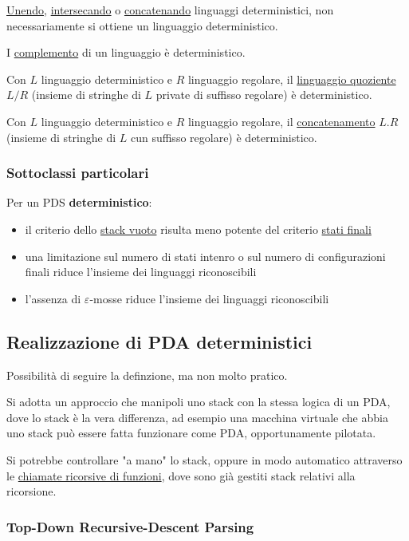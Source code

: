 \underline{Unendo}, \underline{intersecando} o \underline{concatenando} linguaggi deterministici,  non necessariamente si ottiene un linguaggio deterministico.

I \underline{complemento} di un linguaggio è deterministico.

Con $L$ linguaggio deterministico e $R$ linguaggio regolare, il \underline{linguaggio quoziente}  $L/R$ (insieme di stringhe di $L$ private di suffisso regolare) è deterministico.

Con $L$ linguaggio deterministico e $R$ linguaggio regolare, il \underline{concatenamento} $L.R$ (insieme di stringhe di $L$ cun suffisso regolare) è deterministico.

\subsubsection{Sottoclassi particolari}
Per un PDS \textbf{deterministico}:
\begin{itemize}
    \item il criterio dello \underline{stack vuoto} risulta meno potente del criterio \underline{stati finali}
    \item una limitazione sul numero di stati intenro o sul numero di configurazioni finali riduce l'insieme dei linguaggi riconoscibili
    \item l'assenza di $\varepsilon$-mosse riduce l'insieme dei linguaggi riconoscibili
\end{itemize}


\subsection{Realizzazione di PDA deterministici}
Possibilità di seguire la definzione, ma non molto pratico.

Si adotta un approccio che manipoli uno stack con la stessa logica di un PDA, dove lo stack è la vera differenza, ad esempio una macchina virtuale che abbia uno stack può essere fatta funzionare come PDA, opportunamente pilotata.

Si potrebbe controllare "a mano" lo stack, oppure in modo automatico attraverso le \underline{chiamate ricorsive di funzioni}, dove sono già gestiti stack relativi alla ricorsione.

\subsubsection{Top-Down Recursive-Descent Parsing}

